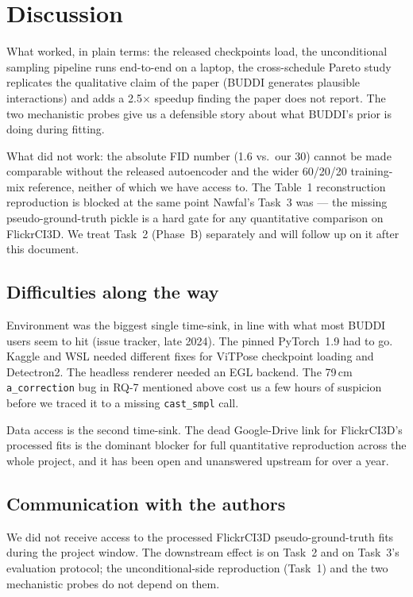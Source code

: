 \documentclass[10pt]{article}
\begin{document}
\section{Discussion}

What worked, in plain terms: the released checkpoints load, the unconditional sampling pipeline runs end-to-end on a laptop, the cross-schedule Pareto study replicates the qualitative claim of the paper (BUDDI generates plausible interactions) and adds a 2.5$\times$ speedup finding the paper does not report. The two mechanistic probes give us a defensible story about what BUDDI's prior is doing during fitting.

What did not work: the absolute FID number (1.6 vs.\ our 30) cannot be made comparable without the released autoencoder and the wider 60/20/20 training-mix reference, neither of which we have access to. The Table~1 reconstruction reproduction is blocked at the same point Nawfal's Task~3 was --- the missing pseudo-ground-truth pickle is a hard gate for any quantitative comparison on FlickrCI3D. We treat Task~2 (Phase~B) separately and will follow up on it after this document.

\subsection{Difficulties along the way}

Environment was the biggest single time-sink, in line with what most BUDDI users seem to hit (issue tracker, late 2024). The pinned PyTorch~1.9 had to go. Kaggle and WSL needed different fixes for ViTPose checkpoint loading and Detectron2. The headless renderer needed an EGL backend. The 79\,cm \texttt{a\_correction} bug in RQ-7 mentioned above cost us a few hours of suspicion before we traced it to a missing \texttt{cast\_smpl} call.

Data access is the second time-sink. The dead Google-Drive link for FlickrCI3D's processed fits is the dominant blocker for full quantitative reproduction across the whole project, and it has been open and unanswered upstream for over a year.

\subsection{Communication with the authors}

We did not receive access to the processed FlickrCI3D pseudo-ground-truth fits during the project window. The downstream effect is on Task~2 and on Task~3's evaluation protocol; the unconditional-side reproduction (Task~1) and the two mechanistic probes do not depend on them.
\end{document}
